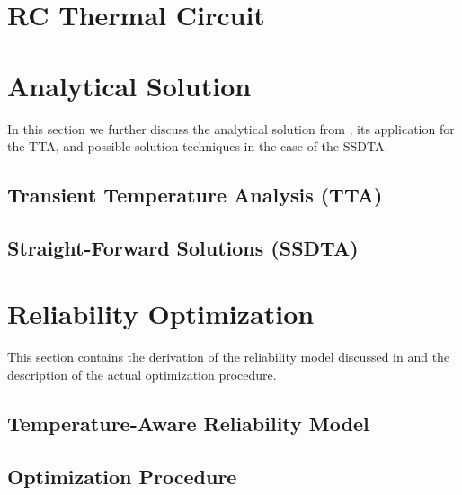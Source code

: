 \renewcommand{\thesection}{S\arabic{section}}
\renewcommand{\thetable}{S\arabic{table}}
\renewcommand{\thefigure}{S\arabic{figure}}
\setcounter{table}{0}
\setcounter{figure}{0}

\section{RC Thermal Circuit} \label{app:thermal-circuits}


\section{Analytical Solution}
In this section we further discuss the analytical solution from , its application for the TTA, and possible solution techniques in the case of the SSDTA.

\subsection{Transient Temperature Analysis (TTA)} \label{app:tta-analytical}


\subsection{Straight-Forward Solutions (SSDTA)} \label{app:straight-forward}


\balance
\section{Reliability Optimization} \label{app:reliability-optimization}
This section contains the derivation of the reliability model discussed in  and the description of the actual optimization procedure.

\subsection{Temperature-Aware Reliability Model}


\subsection{Optimization Procedure} \label{app:genetic-algorithm}

